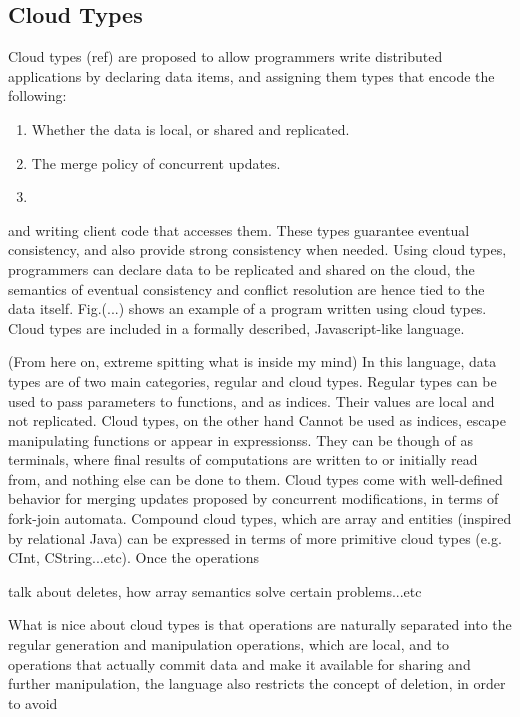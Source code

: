 \subsection{Cloud Types}
Cloud types (ref) are proposed to allow programmers write distributed applications by
declaring data items, and assigning them types that encode the following:
\begin{enumerate}
  \item Whether the data is local, or shared and replicated.
  \item The merge policy of concurrent updates.
  \item 
\end{enumerate}
and writing client code that accesses them.
These types guarantee eventual consistency, and also provide strong consistency
when needed. Using cloud types, programmers can declare data to be replicated
and shared on the cloud, the semantics of eventual consistency and conflict
resolution are hence tied to the data itself. Fig.(...) shows an example of a
program written using cloud types. Cloud types are included in a formally
described, Javascript-like language.

(From here on, extreme spitting what is inside my mind)
In this language, data types are of two main categories, regular and cloud
types. Regular types can be used to pass parameters to functions, and as
indices. Their values are local and not replicated. Cloud types, on the other
hand Cannot be used as indices, escape manipulating functions or appear in
expressionss. They can be though of as terminals, where final results of
computations are written to or initially read from, and nothing else can be done
to them. Cloud types come with well-defined behavior for merging updates
proposed by concurrent modifications, in terms of fork-join automata. Compound
cloud types, which are array and entities (inspired by relational Java) can be
expressed in terms of more primitive cloud types (e.g. CInt, CString...etc).
Once the operations

talk about deletes, how array semantics solve certain problems...etc

What is nice about cloud types is that operations are naturally separated into
the regular generation and manipulation operations, which are local, and to
operations that actually commit data and make it available for sharing and
further manipulation, the language also restricts the concept of deletion, in
order to avoid 


